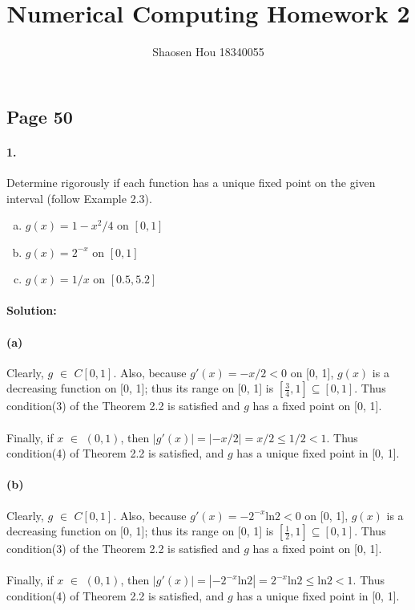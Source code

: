 \documentclass{article}  %
\title{Numerical Computing Homework 2}
\author{Shaosen Hou 18340055}
\begin{document}
 
    \maketitle

        \subsection*{Page 50} 
        \paragraph{1.}Determine rigorously if each function has a unique fixed point on the given interval (follow Example 2.3).
        \begin{enumerate}[(a)]
            \item \(g(x) = 1 - x^2 / 4\) on \([0, 1]\)
            \item \(g(x) = 2^{-x}\) on \([0, 1]\)
            \item \(g(x) = 1 / x\) on \([0.5, 5.2]\)
        \end{enumerate}
        \paragraph{Solution:}
        \paragraph{(a)}Clearly, \(g\) $\in$ \(C[0, 1]\). Also, because \(g'(x) = -x/2 <0\) on [0, 1], \(g(x)\) is a decreasing function on [0, 1]; thus its range on [0, 1] is $[\frac{3}{4}, 1] \subseteq [0, 1].$ Thus condition(3) of the Theorem 2.2 is satisfied and $g$ has a fixed point on [0, 1].
        \paragraph{}Finally, if $x$ $\in$ $(0, 1)$, then $|g'(x)| = |-x/2| = x/2 \leq 1/2 < 1$. Thus condition(4) of Theorem 2.2 is satisfied, and $g$ has a unique fixed point in [0, 1].
        \paragraph{(b)}Clearly, \(g\) $\in$ \(C[0, 1]\). Also, because \(g'(x) = -2^{-x}\mathrm{ln}2 <0\) on [0, 1], \(g(x)\) is a decreasing function on [0, 1]; thus its range on [0, 1] is $[\frac{1}{2}, 1] \subseteq [0, 1].$ Thus condition(3) of the Theorem 2.2 is satisfied and $g$ has a fixed point on [0, 1].
        \paragraph{}Finally, if $x$ $\in$ $(0, 1)$, then $|g'(x)| = |-2^{-x}\mathrm{ln}2| = 2^{-x}\mathrm{ln}2 \leq \mathrm{ln}2 < 1$. Thus condition(4) of Theorem 2.2 is satisfied, and $g$ has a unique fixed point in [0, 1].
\end{document}
